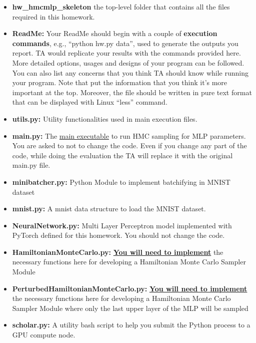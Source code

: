 %
\begin{itemize}
%
\item
    \textbf{hw\homeworknumber\_hmcmlp\_skeleton}
    the top-level folder that contains all the files required in this homework.
%
\item
    \textbf{ReadMe:}
    Your ReadMe should begin with a couple of \textbf{execution commands},
    e.g., ``python hw\homeworknumber.py data'', used to generate the outputs
    you report.
    TA would replicate your results with the commands provided here.
    More detailed options, usages and designs of your program can be followed.
    You can also list any concerns that you think TA should know while running
    your program.
    Note that put the information that you think it's more important at the
    top.
    Moreover, the file should be written in pure text format that can be
    displayed with Linux ``less'' command.
    
%
\item
    \textbf{utils.py:}
    Utility functionalities used in main execution files.

\item
    \textbf{main.py:}
    The \underline{main executable} to run HMC sampling for MLP parameters. You are asked to not to change the code. Even if you change any part of the code, while doing the evaluation the TA will replace it with the original main.py file.


\item
    \textbf{minibatcher.py:}
    Python Module to implement batchifying in MNIST dataset%
\item
    \textbf{mnist.py:} A mnist data structure to load the MNIST dataset.
%
\item
    \textbf{NeuralNetwork.py:} Multi Layer Perceptron model implemented with PyTorch defined for this homework. You should not change the code.
    \item \textbf{HamiltonianMonteCarlo.py:} \underline{\bf You will need to implement} the necessary functions here for developing a Hamiltonian Monte Carlo Sampler Module
    \item \textbf{PerturbedHamiltonianMonteCarlo.py:} \underline{\bf You will need to implement} the necessary functions here for developing a Hamiltonian Monte Carlo Sampler Module where only the last upper layer of the MLP will be sampled
    \item \textbf{scholar.py:} A utility bash script to help you submit the Python process to a GPU compute node.
    
%
\end{itemize}


